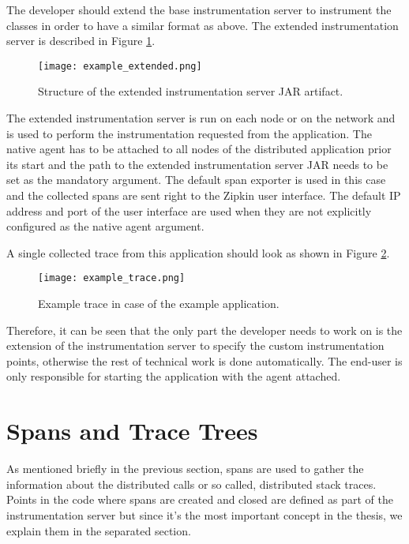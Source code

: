 The developer should extend the base instrumentation server to instrument the classes in order to have a similar format as above. The extended instrumentation server is described in Figure \ref{fig:example_extended}.

	\begin{figure}
		\centering
		\texttt{[image: example\_extended.png]}
		\caption{Structure of the extended instrumentation server JAR artifact.}
		\label{fig:example_extended}
	\end{figure}

The extended instrumentation server is run on each node or on the network and is used to perform the instrumentation requested from the application. The native agent has to be attached to all nodes of the distributed application prior its start and the path to the extended instrumentation server JAR needs to be set as the mandatory argument. The default span exporter is used in this case and the collected spans are sent right to the Zipkin user interface. The default IP address and port of the user interface are used when they are not explicitly configured as the native agent argument.

A single collected trace from this application should look as shown in Figure \ref{fig:example_trace}.

	\begin{figure}
		\centering
		\texttt{[image: example\_trace.png]}
		\caption{Example trace in case of the example application.}
		\label{fig:example_trace}
	\end{figure}

Therefore, it can be seen that the only part the developer needs to work on is the extension of the instrumentation server to specify the custom instrumentation points, otherwise the rest of technical work is done automatically. The end-user is only responsible for starting the application with the agent attached.

\section{Spans and Trace Trees}
\label{subsec:spans}
As mentioned briefly in the previous section, spans are used to gather the information about the distributed calls or so called, distributed stack traces. Points in the code where spans are created and closed are defined as part of the instrumentation server but since it's the most important concept in the thesis, we explain them in the separated section. 

